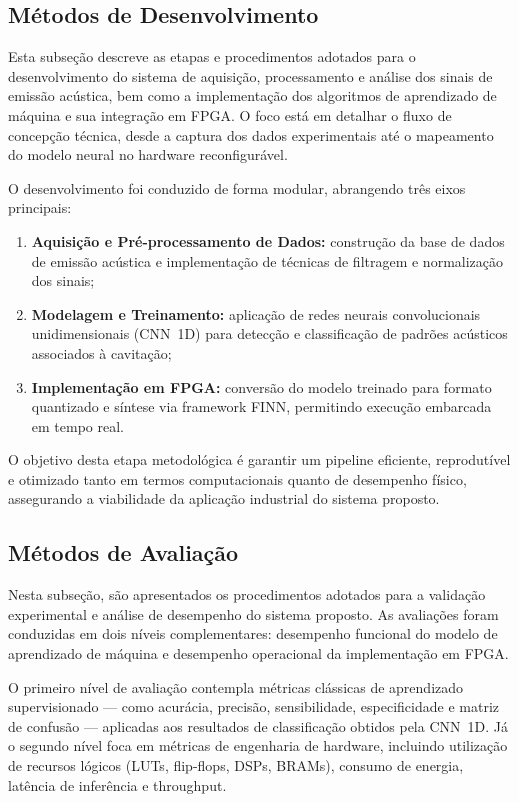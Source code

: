 \subsection*{Métodos de Desenvolvimento}

Esta subseção descreve as etapas e procedimentos adotados para o desenvolvimento do sistema de aquisição, processamento e análise dos sinais de emissão acústica, bem como a implementação dos algoritmos de aprendizado de máquina e sua integração em FPGA. O foco está em detalhar o fluxo de concepção técnica, desde a captura dos dados experimentais até o mapeamento do modelo neural no hardware reconfigurável.

O desenvolvimento foi conduzido de forma modular, abrangendo três eixos principais:
\begin{enumerate}
    \item \textbf{Aquisição e Pré-processamento de Dados:} construção da base de dados de emissão acústica e implementação de técnicas de filtragem e normalização dos sinais;
    \item \textbf{Modelagem e Treinamento:} aplicação de redes neurais convolucionais unidimensionais (CNN~1D) para detecção e classificação de padrões acústicos associados à cavitação;
    \item \textbf{Implementação em FPGA:} conversão do modelo treinado para formato quantizado e síntese via framework FINN, permitindo execução embarcada em tempo real.
\end{enumerate}

O objetivo desta etapa metodológica é garantir um pipeline eficiente, reprodutível e otimizado tanto em termos computacionais quanto de desempenho físico, assegurando a viabilidade da aplicação industrial do sistema proposto.

\subsection*{Métodos de Avaliação}

Nesta subseção, são apresentados os procedimentos adotados para a validação experimental e análise de desempenho do sistema proposto. As avaliações foram conduzidas em dois níveis complementares: desempenho funcional do modelo de aprendizado de máquina e desempenho operacional da implementação em FPGA.

O primeiro nível de avaliação contempla métricas clássicas de aprendizado supervisionado — como acurácia, precisão, sensibilidade, especificidade e matriz de confusão — aplicadas aos resultados de classificação obtidos pela CNN~1D. Já o segundo nível foca em métricas de engenharia de hardware, incluindo utilização de recursos lógicos (LUTs, flip-flops, DSPs, BRAMs), consumo de energia, latência de inferência e throughput.

